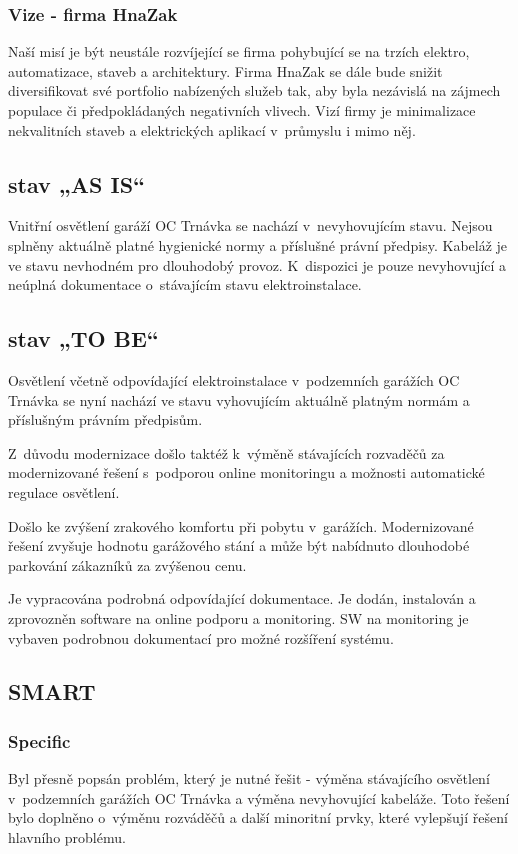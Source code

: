 \documentclass[a4paper, twoside, 11pt]{article}
\begin{document}
		\subsubsection{Vize - firma HnaZak}
		Naší misí je být neustále rozvíjející se firma pohybující se na trzích elektro, automatizace, staveb a architektury. Firma HnaZak se dále bude snižit diversifikovat své portfolio nabízených služeb tak, aby byla nezávislá na zájmech populace či předpokládaných negativních vlivech. Vizí firmy je minimalizace nekvalitních staveb a elektrických aplikací v~průmyslu i mimo něj.
		
	\subsection{stav „AS IS“}
		Vnitřní osvětlení garáží OC Trnávka se nachází v~nevyhovujícím stavu. Nejsou splněny aktuálně platné hygienické normy a příslušné právní předpisy. Kabeláž je ve stavu nevhodném pro dlouhodobý provoz. K~dispozici je pouze nevyhovující a neúplná dokumentace o~stávajícím stavu elektroinstalace.
	\subsection{stav „TO BE“}
		Osvětlení včetně odpovídající elektroinstalace v~podzemních garážích OC Trnávka se nyní nachází ve stavu vyhovujícím aktuálně platným normám a příslušným právním předpisům. \par
		Z~důvodu modernizace došlo taktéž k~výměně stávajících rozvaděčů za modernizované řešení s~podporou online monitoringu a možnosti automatické regulace osvětlení.\par
		Došlo ke zvýšení zrakového komfortu při pobytu v~garážích. Modernizované řešení zvyšuje hodnotu garážového stání a může být nabídnuto dlouhodobé parkování zákazníků za zvýšenou cenu.\par
		Je vypracována podrobná odpovídající dokumentace. Je dodán, instalován a zprovozněn software na online podporu a monitoring. SW na monitoring je vybaven podrobnou dokumentací pro možné rozšíření systému.
	\subsection{SMART}
		\subsubsection{Specific}
			Byl přesně popsán problém, který je nutné řešit - výměna stávajícího osvětlení v~podzemních garážích OC Trnávka a výměna nevyhovující kabeláže. Toto řešení bylo doplněno o~výměnu rozváděčů a další minoritní prvky, které  vylepšují řešení hlavního problému.
\end{document}
